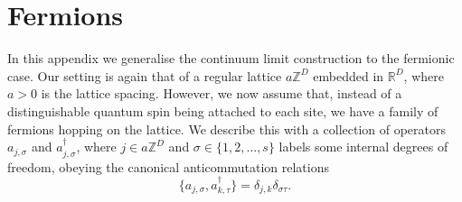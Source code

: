 \documentclass[prl,twocolumn,lengthcheck,superscriptaddress]{revtex4-1}
\theoremstyle{definition}
\theoremstyle{remark}
\begin{document}

\section{Fermions}
In this appendix we generalise the continuum limit construction to the fermionic case. Our setting is again that of a regular lattice $a\mathbb{Z}^D$ embedded in $\mathbb{R}^D$, where $a>0$ is the lattice spacing. However, we now assume that, instead of a distinguishable quantum spin being attached to each site, we have a family of fermions hopping on the lattice. We describe this with a collection of operators $a_{j,\sigma}$ and $a^{\dag}_{j,\sigma}$, where $j\in a\mathbb{Z}^D$ and $\sigma \in \{1,2, \ldots, s\}$ labels some internal degrees of freedom, obeying the canonical anticommutation relations
\begin{equation}
	\{a_{j,\sigma}, a^{\dag}_{k,\tau}\} = \delta_{j,k}\delta_{\sigma\tau}.
\end{equation}
\end{document}
